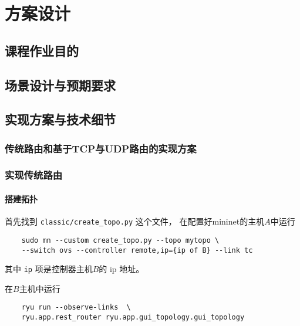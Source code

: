 \chapter{方案设计}
\label{cha:example}

\setmonofont{Cascadia Code}
\newfontfamily{}
\newfontfamily{}

\lstset{
    basicstyle = \small\ttfamily,
    tabsize=4
}

\section{课程作业目的}

\section{场景设计与预期要求}

\section{实现方案与技术细节}

\subsection{传统路由和基于TCP与UDP路由的实现方案}

\subsection{实现传统路由}

\subsubsection{搭建拓扑}

首先找到 \texttt{classic/create\_{}topo.py} 这个文件，
在配置好mininet的主机$A$中运行
\begin{lstlisting}
	sudo mn --custom create_topo.py --topo mytopo \
	--switch ovs --controller remote,ip={ip of B} --link tc
\end{lstlisting}

其中 \texttt{ip} 项是控制器主机$B$的 ip 地址。

在$B$主机中运行

\begin{lstlisting}
	ryu run --observe-links  \
	ryu.app.rest_router ryu.app.gui_topology.gui_topology
\end{lstlisting}

